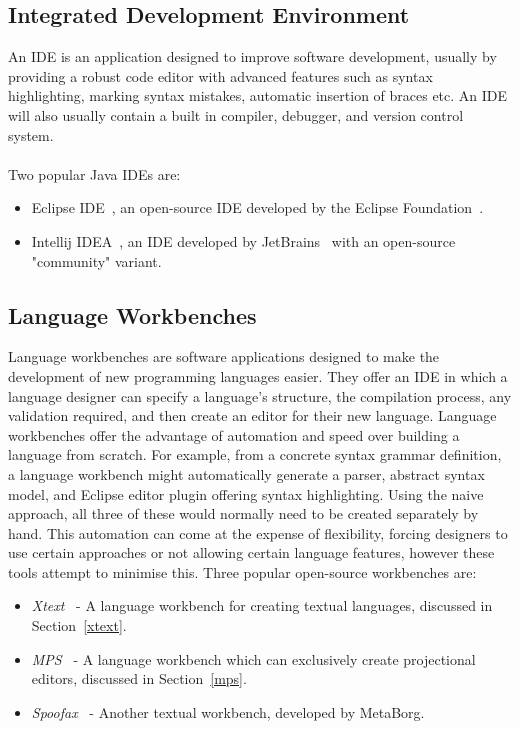 \documentclass{article}
\begin{document}
\subsection{Integrated Development Environment}
An IDE is an application designed to improve software development, usually by providing a robust code editor with advanced features such as syntax highlighting, marking syntax mistakes, automatic insertion of braces etc. An IDE will also usually contain a built in compiler, debugger, and version control system. 
\\
\\
Two popular Java IDEs are:
\begin{itemize}
\item Eclipse IDE~\cite{eclipse}, an open-source IDE developed by the Eclipse Foundation~\cite{eclipseFoundation}.
\item Intellij IDEA~\cite{intellij}, an IDE developed by JetBrains~\cite{jetbrains} with an open-source "community" variant.
\end{itemize}
%
\subsection{Language Workbenches}
Language workbenches are software applications designed to make the development of new programming languages easier. They offer an IDE in which a language designer can specify a language's structure, the compilation process, any validation required, and then create an editor for their new language. Language workbenches offer the advantage of automation and speed over building a language from scratch. For example, from a concrete syntax grammar definition, a language workbench might automatically generate a parser, abstract syntax model, and Eclipse editor plugin offering syntax highlighting. Using the naive approach, all three of these would normally need to be created separately by hand. This automation can come at the expense of flexibility, forcing designers to use certain approaches or not allowing certain language features, however these tools attempt to minimise this. Three popular open-source workbenches are:
\begin{itemize}
\item \emph{Xtext}~\cite{xtext} - A language workbench for creating textual languages, discussed in Section~\ref{xtext}.
\item \emph{MPS}~\cite{mps} - A language workbench which can exclusively create projectional editors, discussed in Section~\ref{mps}.
\item \emph{Spoofax}~\cite{spoofax} - Another textual workbench, developed by MetaBorg. 
\end{itemize}
%
\end{document}
